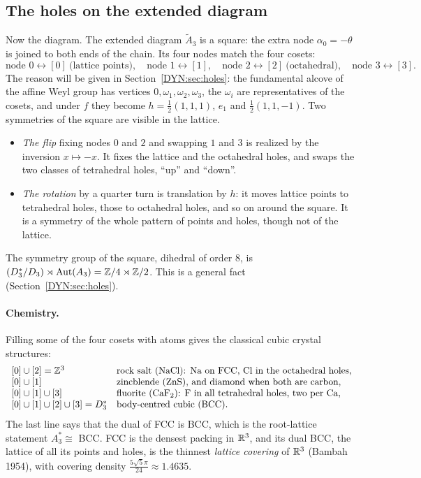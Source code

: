 \subsection*{The holes on the extended diagram}
Now the diagram. The extended diagram $\tilde A_3$ is a square: the extra node $\alpha_0=-\theta$ is
joined to both ends of the chain. Its four nodes match the four cosets:
\[
  \text{node }0\leftrightarrow[0]\ \text{(lattice points)},\quad
  \text{node }1\leftrightarrow[1],\quad \text{node }2\leftrightarrow[2]\ \text{(octahedral)},\quad
  \text{node }3\leftrightarrow[3].
\]
The reason will be given in Section~\ref{DYN:sec:holes}: the fundamental alcove of the affine Weyl group
has vertices $0,\omega_1,\omega_2,\omega_3$, the $\omega_i$ are representatives of the cosets, and under $f$
they become $h=\frac12(1,1,1)$, $e_1$ and $\frac12(1,1,-1)$. Two symmetries of the square are visible in the lattice.
\begin{itemize}
\item \emph{The flip} fixing nodes $0$ and $2$ and swapping $1$ and $3$ is realized by the inversion $x\mapsto-x$. It
  fixes the lattice and the octahedral holes, and swaps the two classes of tetrahedral holes, ``up'' and
  ``down''.
\item \emph{The rotation} by a quarter turn is translation by $h$: it moves lattice points to
  tetrahedral holes, those to octahedral holes, and so on around the square. It is a symmetry of the whole
  pattern of points and holes, though not of the lattice.
\end{itemize}
The symmetry group of the square, dihedral of order $8$, is $(D_3^*/D_3)\rtimes\operatorname{Aut}(A_3)
=\mathbb{Z}/4\rtimes\mathbb{Z}/2$. This is a general fact (Section~\ref{DYN:sec:holes}).

\paragraph{Chemistry.} Filling some of the four cosets with atoms gives the classical cubic crystal
structures:
\[
  \begin{array}{ll}
  [0]\cup[2]=\mathbb{Z}^3 & \text{rock salt (NaCl): Na on FCC, Cl in the octahedral holes,}\\
  {}[0]\cup[1] & \text{zincblende (ZnS), and diamond when both are carbon,}\\
  {}[0]\cup[1]\cup[3] & \text{fluorite (CaF$_2$): F in all tetrahedral holes, two per Ca,}\\
  {}[0]\cup[1]\cup[2]\cup[3]=D_3^* & \text{body-centred cubic (BCC).}
  \end{array}
\]
The last line says that the dual of FCC is BCC, which is the root-lattice statement $A_3^*\cong$ BCC.
FCC is the densest packing in $\mathbb{R}^3$, and its dual BCC, the lattice of all its points and holes, is the
thinnest \emph{lattice covering} of $\mathbb{R}^3$ (Bambah 1954), with covering density
$\frac{5\sqrt5\pi}{24}\approx1.4635$.

